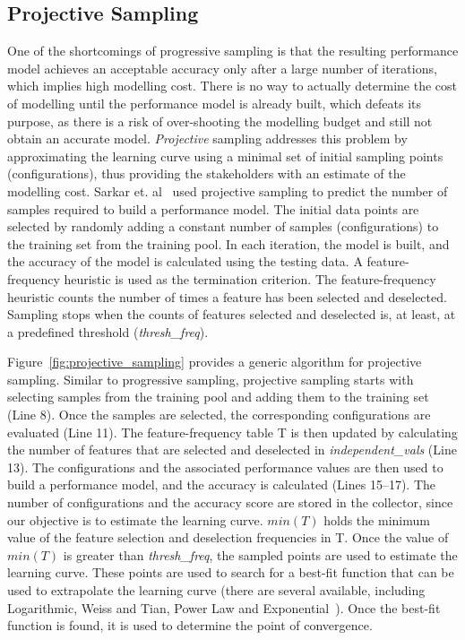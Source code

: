 \documentclass[sigconf]{acmart}
\begin{document}
\subsection{Projective Sampling}\label{sec:soa}

One of the shortcomings of progressive sampling is that the resulting 
performance model achieves an acceptable accuracy only after a large number of iterations, which implies  high modelling cost. There is no way to actually determine the cost of modelling until the performance model is already built, which defeats its purpose, as there is a risk of over-shooting the modelling budget and still not obtain an accurate model. \emph{Projective} sampling addresses this problem by approximating the learning curve using a minimal set of initial sampling points (configurations), thus providing the stakeholders with an estimate of the modelling cost. Sarkar et. al~\cite{sarkar2015cost} used projective sampling to predict the number of samples required to build a performance model. The initial data points are selected by randomly adding a constant number of samples (configurations) to the training set from the training pool. In each iteration, the model is built, and the accuracy of the model is calculated using the testing data. 
A feature-frequency heuristic is used as the termination criterion.
The feature-frequency heuristic counts the number of times a feature has been selected and deselected. Sampling stops when the counts of features selected and deselected is, at least, at a predefined threshold (\textit{thresh\_freq}).



Figure~\ref{fig:projective_sampling} provides a generic algorithm for projective sampling. Similar to progressive sampling, projective sampling starts with selecting samples from the training pool and adding them to the training set (Line 8). Once the samples are selected, the corresponding configurations are evaluated (Line 11). The feature-frequency table T is then updated by calculating the number of features that are selected and deselected in \textit{independent\_vals} (Line 13). The configurations and the associated performance values are then used to build a performance model, and the accuracy is calculated (Lines 15--17). The number of configurations and the accuracy score are stored in the collector, since our objective is to estimate the learning curve.  $min(T)$ holds the minimum value of the feature selection and deselection frequencies in T. Once the value of $min(T)$ is greater than  \textit{thresh\_freq}, the sampled points are used to estimate the learning curve. These points are used to search for a best-fit function that can be used to extrapolate the learning curve (there are several available, including Logarithmic, Weiss and Tian, Power Law and Exponential~\cite{sarkar2015cost}). Once the best-fit function is found, it is used to determine the point of convergence.
\end{document}
